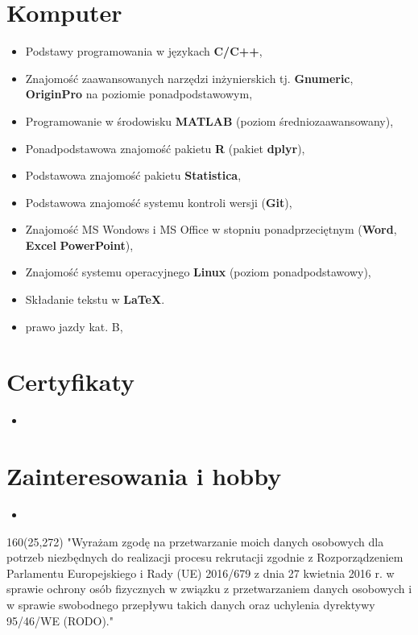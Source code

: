 \documentclass[10pt, a4paper, sans]{moderncv}   %
\begin{document}

\section{Komputer}
{\begin{itemize}
	\item Podstawy programowania w językach \textbf{C/C++}, 
	\item Znajomość zaawansowanych narzędzi inżynierskich tj. \textbf{Gnumeric}, \textbf{OriginPro} na poziomie ponadpodstawowym,
	\item Programowanie w środowisku \textbf{MATLAB} (poziom średniozaawansowany),
    \item Ponadpodstawowa znajomość pakietu \textbf{R} (pakiet \textbf{dplyr}),
    \item Podstawowa znajomość pakietu \textbf{Statistica},
    \item Podstawowa znajomość systemu kontroli wersji (\textbf{Git}),
	\item Znajomość MS Wondows i MS Office w stopniu ponadprzeciętnym (\textbf{Word}, \textbf{Excel} \textbf{PowerPoint}),
	\item Znajomość systemu operacyjnego \textbf{Linux} (poziom ponadpodstawowy),
	\item Składanie tekstu w \textbf{\LaTeX}.
	\item prawo jazdy kat. B,
\end{itemize}}

\section{Certyfikaty}
{\begin{itemize}
 \item
\end{itemize}}


\section{Zainteresowania i hobby}
{\begin{itemize}
\item 

\end{itemize}}

\begin{textblock}{160}(25,272)
\noindent "Wyrażam zgodę na przetwarzanie moich danych osobowych dla potrzeb niezbędnych do realizacji procesu rekrutacji zgodnie z Rozporządzeniem Parlamentu Europejskiego i Rady (UE) 2016/679 z dnia 27 kwietnia 2016 r. w sprawie ochrony osób fizycznych w związku z przetwarzaniem danych osobowych i w sprawie swobodnego przepływu takich danych oraz uchylenia dyrektywy 95/46/WE (RODO)."

\end{textblock}
\end{document}
